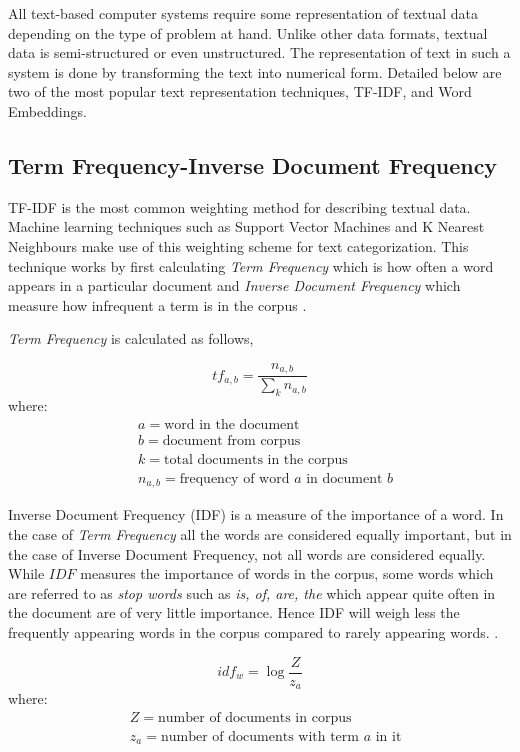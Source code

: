 All text-based computer systems require some representation of textual data depending on the type of problem at hand. Unlike other data formats, textual data is semi-structured or even unstructured. The representation of text in such a system is done by transforming the text into numerical form.  Detailed below are two of the most popular text representation techniques, \gls{TF-IDF}, and Word Embeddings.  

\subsection{Term Frequency-Inverse Document Frequency}
\gls{TF-IDF} is the most common weighting method for describing textual data. Machine learning techniques such as Support Vector Machines and K Nearest Neighbours make use of this weighting scheme for text categorization. This technique works by first calculating \textit{Term Frequency} which is how often a word appears in a particular document and \textit{Inverse Document Frequency} which measure how infrequent a term is in the corpus \cite{soucy2005beyond}.

\textit{Term Frequency} is calculated as follows,

\begin{equation}\label{tf}
tf_{a,b} = \frac{n_{a,b}}{\sum_{k}n_{a,b}}
\end{equation}
where:
\begin{align*}
      & a=\text{word in the document}\\
      & b=\text{document from corpus}\\
      & k=\text{total documents in the corpus}      \\
      & n_{a,b}=\text{frequency of word $a$ in document $b$}      
\end{align*}                

Inverse Document Frequency (IDF) is a measure of the importance of a word. In the case of \textit{Term Frequency} all the words are considered equally important, but in the case of Inverse Document Frequency, not all words are considered equally. While $IDF$ measures the importance of words in the corpus, some words which are referred to as \textit{stop words} such as \textit{is, of, are, the} which appear quite often in the document are of very little importance. Hence IDF will weigh less the frequently appearing words in the corpus compared to rarely appearing words. \cite{robertson2004understanding}. 

\begin{equation}\label{idf}
idf_{w} = \log\frac{Z}{z_{a}}
\end{equation}
where:
\begin{align*}
      & Z=\text{number of documents in corpus}\\
      & z_{a}=\text{number of documents with term $a$ in it}\\
\end{align*}     

